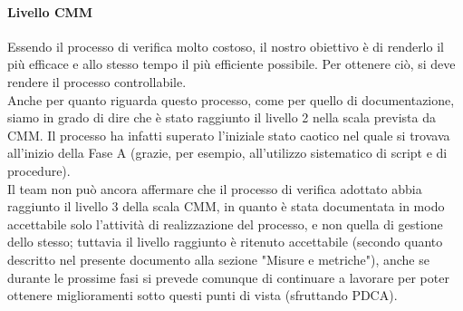 \documentclass[../PianoDiQualifica.tex]{subfiles}
\begin{document}
\begin{appendices}
			\paragraph{Livello CMM}
			Essendo il processo di verifica molto costoso, il nostro obiettivo è di renderlo il più efficace e allo stesso tempo il più efficiente possibile. Per ottenere ciò, si deve rendere il processo controllabile. \\
			Anche per quanto riguarda questo processo, come per quello di documentazione, siamo in grado di dire che è stato raggiunto il livello 2 nella scala prevista da CMM. Il processo ha infatti superato l'iniziale stato caotico nel quale si trovava all'inizio della Fase A (grazie, per esempio, all'utilizzo sistematico di script e di procedure). \\
			Il team non può ancora affermare che il processo di verifica adottato abbia raggiunto il livello 3 della scala CMM, in quanto è stata documentata in modo accettabile solo l'attività di realizzazione del processo, e non quella di gestione dello stesso; tuttavia il livello raggiunto è ritenuto accettabile (secondo quanto descritto nel presente documento alla sezione "Misure e metriche"), anche se durante le prossime fasi si prevede comunque di continuare a lavorare per poter ottenere miglioramenti sotto questi punti di vista (sfruttando PDCA).
\end{appendices}
\end{document}
